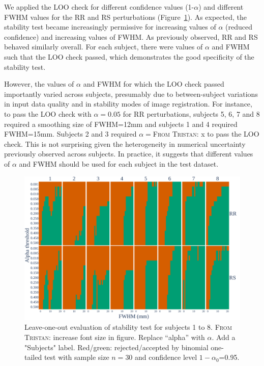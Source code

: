 \documentclass[lettersize,journal]{IEEEtran}
\newcommand{\TG}[1]{\color{blue}\textsc{From Tristan:} #1\color{black}\xspace}
\begin{document}
We applied the LOO check for different confidence values (1-$\alpha$) and different FWHM  values for the RR and RS perturbations (Figure~\ref{fig:loo_bonferroni}). As expected, the stability test became increasingly permissive for increasing values of $\alpha$ (reduced confidence) and increasing values of FWHM. As previously observed, RR and RS behaved similarly overall. For each subject, there were values of $\alpha$ and FWHM such that the LOO check passed, which demonstrates the good specificity of the stability test.

However, the values of $\alpha$ and FWHM for which the LOO check passed importantly varied across subjects, presumably due to between-subject variations in input data quality and in stability modes of image registration. For instance, to pass the LOO check with $\alpha=0.05$ for RR perturbations, subjects 5, 6, 7 and 8 required a smoothing size of FWHM=12mm and subjects 1 and 4 required FWHM=15mm. Subjects 2 and 3 required $\alpha=$\TG{x} to pass the LOO check. This is not surprising given the heterogeneity in numerical uncertainty previously observed across subjects. In practice, it suggests that different values of $\alpha$ and FWHM should be used for each subject in the test dataset.

\begin{figure}
    \centering
    \includegraphics[width=\linewidth]{figures/loo_fwe_bonferroni.pdf}
    \caption{Leave-one-out evaluation of stability test for subjects 1 to 8. \TG{increase font size in figure. Replace ``alpha'' with $\alpha$. Add a "Subjects" label.}
        Red/green: rejected/accepted by binomial one-tailed test with sample size $n=30$ and confidence level $1-\alpha_0$=0.95.}
    \label{fig:loo_bonferroni}
\end{figure}
\end{document}
